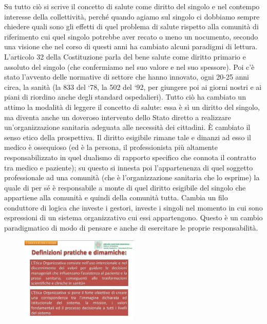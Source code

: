 Su tutto ciò si scrive il concetto di salute come diritto del singolo e
nel contempo interesse della collettività, perché quando agiamo sul
singolo ci dobbiamo sempre chiedere quali sono gli effetti di quel
problema di salute rispetto alla comunità di riferimento cui quel
singolo potrebbe aver recato o meno un nocumento, secondo una visione
che nel corso di questi anni ha cambiato alcuni paradigmi di lettura.
L'articolo 32 della Costituzione parla del bene salute come diritto
primario e assoluto del singolo (che confermiamo nel suo valore e nel
suo spessore). Poi c'è stato l'avvento delle normative di settore che
hanno innovato, ogni 20-25 anni circa, la sanità (la 833 del `78, la 502
del `92, per giungere poi ai giorni nostri e ai piani di riordino anche
degli standard ospedalieri). Tutto ciò ha cambiato un attimo la modalità
di leggere il concetto di salute: essa è sì un diritto del singolo, ma
diventa anche un doveroso intervento dello Stato diretto a realizzare
un'organizzazione sanitaria adeguata alle necessità dei cittadini. È
cambiato il senso etico della prospettiva. Il diritto esigibile rimane
tale e dinanzi ad esso il medico è ossequioso (ed è la persona, il
professionista più altamente responsabilizzato in quel dualismo di
rapporto specifico che connota il contratto tra medico e paziente); su
questo si innesta poi l'appartenenza di quel soggetto professionale ad
una comunità (che è l'organizzazione sanitaria che lo esprime) la quale
di per sé è responsabile a monte di quel diritto esigibile del singolo
che appartiene alla comunità e quindi della comunità tutta. Cambia un
filo conduttore di logica che investe i gestori, investe i singoli nel
momento in cui sono espressioni di un sistema organizzativo cui essi
appartengono. Questo è un cambio paradigmatico di modo di pensare e
anche di esercitare le proprie responsabilità.

 \begin{figure}[!ht]
\centering
	\includegraphics[width=0.5\textwidth]{32/image5.jpeg}
	\end{figure}

